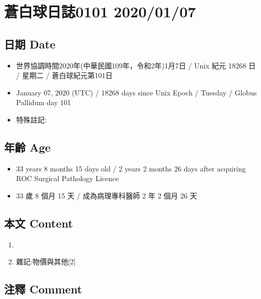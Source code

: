 \documentclass[
]{article}
\providecommand{\tightlist}{%
  \setlength{\itemsep}{0pt}\setlength{\parskip}{0pt}}
\begin{document}
\hypertarget{ux84bcux767dux7403ux65e5ux8a8c0101-20200107}{%
\section{蒼白球日誌0101
2020/01/07}\label{ux84bcux767dux7403ux65e5ux8a8c0101-20200107}}

\hypertarget{ux65e5ux671f-date-37}{%
\subsection{日期 Date}\label{ux65e5ux671f-date-37}}

\begin{itemize}
\tightlist
\item
  世界協調時間2020年(中華民國109年，令和2年)1月7日 / Unix 紀元 18268 日
  / 星期二 / 蒼白球紀元第101日
\item
  January 07, 2020 (UTC) / 18268 days since Unix Epoch / Tuesday /
  Globus Pallidum day 101
\item
  特殊註記:
\end{itemize}

\hypertarget{ux5e74ux9f61-age-37}{%
\subsection{年齡 Age}\label{ux5e74ux9f61-age-37}}

\begin{itemize}
\tightlist
\item
  33 years 8 months 15 days old / 2 years 2 months 26 days after
  acquiring ROC Surgical Pathology Licence
\item
  33 歲 8 個月 15 天 / 成為病理專科醫師 2 年 2 個月 26 天
\end{itemize}

\hypertarget{ux672cux6587-content-37}{%
\subsection{本文 Content}\label{ux672cux6587-content-37}}

\begin{enumerate}
\def\labelenumi{\arabic{enumi}.}
\item
\item
  雜記:物價與其他{[}2{]}
\end{enumerate}

\hypertarget{ux6ce8ux91cb-comment-36}{%
\subsection{注釋 Comment}\label{ux6ce8ux91cb-comment-36}}
\end{document}
